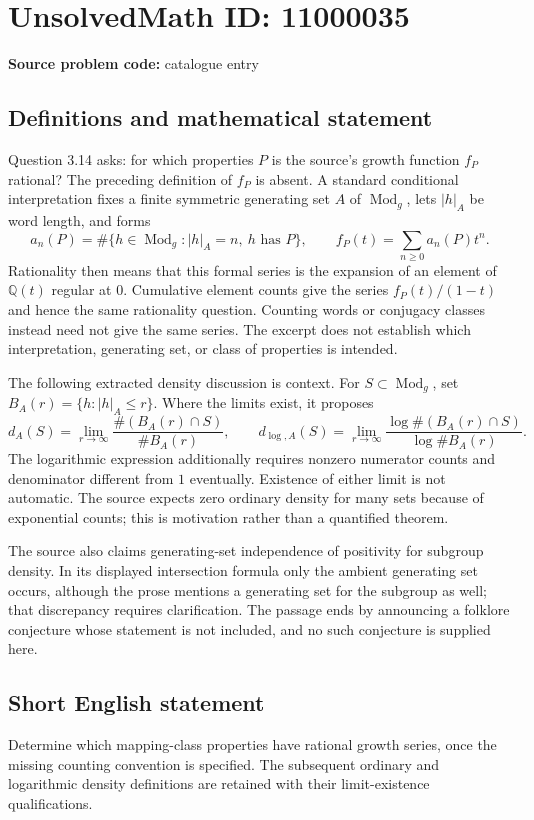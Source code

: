 \documentclass[11pt]{article}
\newcommand{\Q}{\mathbb{Q}}
\begin{document}
\section*{UnsolvedMath ID: 11000035}
\textbf{Source problem code:} catalogue entry
\subsection{Definitions and mathematical statement}
Question 3.14 asks: for which properties $P$ is the source's growth function $f_P$ rational? The preceding definition of $f_P$ is absent. A standard conditional interpretation fixes a finite symmetric generating set $A$ of $\operatorname{Mod}_g$, lets $|h|_A$ be word length, and forms
\[
 a_n(P)=\#\{h\in\operatorname{Mod}_g:|h|_A=n,\ h\text{ has }P\},
 \qquad f_P(t)=\sum_{n\geq0}a_n(P)t^n.
\]
Rationality then means that this formal series is the expansion of an element of $\Q(t)$ regular at $0$. Cumulative element counts give the series $f_P(t)/(1-t)$ and hence the same rationality question. Counting words or conjugacy classes instead need not give the same series. The excerpt does not establish which interpretation, generating set, or class of properties is intended.

The following extracted density discussion is context. For $S\subset\operatorname{Mod}_g$, set $B_A(r)=\{h:|h|_A\leq r\}$. Where the limits exist, it proposes
\[
 d_A(S)=\lim_{r\to\infty}\frac{\#(B_A(r)\cap S)}{\#B_A(r)},\qquad
 d_{\log,A}(S)=\lim_{r\to\infty}
 \frac{\log\#(B_A(r)\cap S)}{\log\#B_A(r)}.
\]
The logarithmic expression additionally requires nonzero numerator counts and denominator different from $1$ eventually. Existence of either limit is not automatic. The source expects zero ordinary density for many sets because of exponential counts; this is motivation rather than a quantified theorem.

The source also claims generating-set independence of positivity for subgroup density. In its displayed intersection formula only the ambient generating set occurs, although the prose mentions a generating set for the subgroup as well; that discrepancy requires clarification. The passage ends by announcing a folklore conjecture whose statement is not included, and no such conjecture is supplied here.
\subsection{Short English statement}
Determine which mapping-class properties have rational growth series, once the missing counting convention is specified. The subsequent ordinary and logarithmic density definitions are retained with their limit-existence qualifications.
\end{document}
